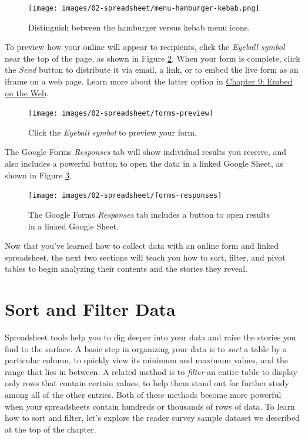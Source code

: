 \documentclass[
  english,
]{book}
\begin{document}
\begin{figure}
\centering
\texttt{[image: images/02-spreadsheet/menu-hamburger-kebab.png]}
\caption{\label{fig:menu-hamburger-kebab}Distinguish between the hamburger versus kebab menu icons.}
\end{figure}

To preview how your online will appear to recipients, click the \emph{Eyeball symbol} near the top of the page, as shown in Figure \ref{fig:forms-preview}. When your form is complete, click the \emph{Send} button to distribute it via email, a link, or to embed the live form as an iframe on a web page. Learn more about the latter option in \href{embed.html}{Chapter 9: Embed on the Web}.



\begin{figure}
\texttt{[image: images/02-spreadsheet/forms-preview]} \caption{Click the \emph{Eyeball symbol} to preview your form.}\label{fig:forms-preview}
\end{figure}

The Google Forms \emph{Responses} tab will show individual results you receive, and also includes a powerful button to open the data in a linked Google Sheet, as shown in Figure \ref{fig:forms-responses}.



\begin{figure}
\texttt{[image: images/02-spreadsheet/forms-responses]} \caption{The Google Forms \emph{Responses} tab includes a button to open results in a linked Google Sheet.}\label{fig:forms-responses}
\end{figure}

Now that you've learned how to collect data with an online form and linked spreadsheet, the next two sections will teach you how to sort, filter, and pivot tables to begin analyzing their contents and the stories they reveal.

\hypertarget{sort}{%
\section*{Sort and Filter Data}\label{sort}}

Spreadsheet tools help you to dig deeper into your data and raise the stories you find to the surface. A basic step in organizing your data is to \emph{sort} a table by a particular column, to quickly view its minimum and maximum values, and the range that lies in between. A related method is to \emph{filter} an entire table to display only rows that contain certain values, to help them stand out for further study among all of the other entries. Both of these methods become more powerful when your spreadsheets contain hundreds or thousands of rows of data. To learn how to sort and filter, let's explore the reader survey sample dataset we described at the top of the chapter.
\end{document}
